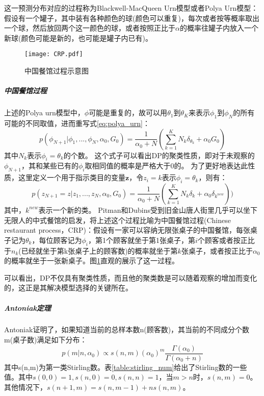 这一预测分布对应的过程称为Blackwell-MacQueen Urn模型或者Polya Urn模型：假设有一个罐子，其中装有各种颜色的球(颜色可以重复)，每次或者按等概率取出一个球，然后放回两个这一颜色的球，或者按照正比于$\alpha$的概率往罐子内放入一个新球(颜色可能是新的，也可能是罐子内已有)。
\begin{figure}
\texttt{[image: CRP.pdf]} 

  \caption{中国餐馆过程示意图} \label{fig:CRP}
\end{figure}
\subparagraph{中国餐馆过程}
上述的Polya urn模型中，$\phi$可能是重复的，故可以用$\theta_1$到$\theta_K$来表示$\phi_1$到$\phi_N$的所有可能的不同取值，进而重写式\eqref{eq:polya_urn}：
\begin{equation}
p(\phi_{N+1}|\phi_1,...,\phi_N,\alpha_0,G_0) = \frac{1}{\alpha_0+N}(\sum_{k=1}^KN_k\delta_{\theta_k} +\alpha_0G_0 ) \label{eq:crp_phi}
\end{equation}
其中$N_k$表示$\phi_i = \theta_k$的个数。
这个式子可以看出DP的聚类性质，即对于未观察的$\phi_{N+1}$，其和某些已有的$\phi_i$取相同值的概率是严格大于0的。
为了更好地表达此性质，这里定义一个用于指示类目的变量${\bm z}$，令$z_i = k$表示$\phi_i = \theta_k$，则有：
\begin{equation}
p(z_{N+1} = z |z_1,...,z_N,\alpha_0,G_0) = \frac{1}{\alpha_0+N}(\sum_{k=1}^KN_k\delta_k +\alpha_0\delta_{k^{new}}))\label{eq:crp_z}
\end{equation}
其中，$k^{new}$表示一个新的类。
Pitman和Dubins受到旧金山唐人街里几乎可以坐下无限人的中式餐馆的启发，将上述这个过程比喻为中国餐馆过程(Chinese restaurant process，CRP)：假设有一家可以容纳无限张桌子的中国餐馆，每张桌子记为$\theta_k$，每位顾客记为$\phi_i$，第1个顾客就坐于第1张桌子，第$i$个顾客或者按正比于$n_k$(已经就坐于第k张桌子上的顾客数)的概率就坐于第$k$张桌子，或者按正比于$\alpha_0$的概率就坐于一张新桌子。图\ref{fig:CRP}直观的展示了这一过程。

可以看出，DP不仅具有聚类性质，而且他的聚类数是可以随着观察的增加而变化的，这正是其解决模型选择的关键所在。
\subparagraph{Antoniak定理}
Antoniak\cite{antoniak:74}证明了，如果知道当前的总样本数n(顾客数)，其当前的不同成分个数m(桌子数)满足如下分布：
\begin{equation}
p(m|n,\alpha_0) \propto s(n,m)(\alpha_0)^m\frac{\Gamma(\alpha_0)}{\Gamma(\alpha_0+n)}  \label{eq:antoniak}
\end{equation}
其中s(n,m)为第一类Stirling数。表\ref{table:stirling_num}给出了Stirling数的一些值。其中$s(0,0)=1,s(n,0)=0,s(n,n)=1$，当$m>n$时，$s(n,m)=0$。其他情况下，$s(n+1,m)=s(n,m-1) + ns(n,m)$。

